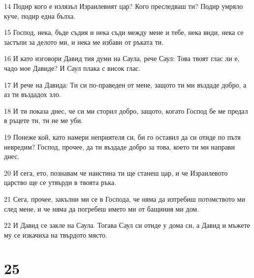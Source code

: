 \par 14 Подир кого е излязъл Израилевият цар? Кого преследваш ти? Подир умряло куче, подир една бълха.
\par 15 Господ, нека, бъде съдия и нека съди между мене и тебе, нека види, нека се застъпи за делото ми, и нека ме избави от ръката ти.
\par 16 И като изговори Давид тия думи на Саула, рече Саул: Това твоят глас ли е, чадо мое Давиде? И Саул плака с висок глас.
\par 17 И рече на Давида: Ти си по-праведен от мене, защото ти ми въздаде добро, а аз ти въздадох зло.
\par 18 И ти показа днес, че си ми сторил добро, защото, когато Господ бе ме предал в ръцете ти, ти не ме уби.
\par 19 Понеже кой, като намери неприятеля си, би го оставил да си отиде по пътя невредим? Господ, прочее, да ти въздаде добро за това, което ти ми направи днес.
\par 20 И сега, ето, познавам че наистина ти ще станеш цар, и че Израилевото царство ще се утвърди в твоята ръка.
\par 21 Сега, прочее, закълни ми се в Господа, че няма да изтребиш потомството ми след мене, и че няма да погребеш името ми от бащиния ми дом.
\par 22 И Давид се закле на Саула. Тогава Саул си отиде у дома си, а Давид и мъжете му се изкачиха на твърдото място.

\chapter{25}

